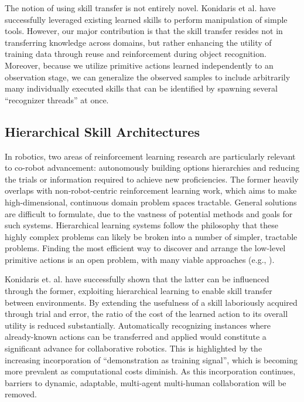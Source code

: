 \documentclass[letterpaper]{article}
\begin{document}
  The notion of using skill transfer is not entirely novel.  Konidaris et al.  have successfully leveraged existing learned skills to perform manipulation of simple tools. However, our major contribution is that the skill transfer resides not in transferring knowledge across domains, but rather enhancing the utility of training data through reuse and reinforcement during object recognition. Moreover, because we utilize primitive actions learned independently to an observation stage, we can generalize the observed samples to include arbitrarily many individually executed skills that can be identified by spawning several ``recognizer threads'' at once.


\subsection{Hierarchical Skill Architectures}
  In robotics, two areas of reinforcement learning research are particularly relevant to co-robot advancement: autonomously building options hierarchies and reducing the trials or information required to achieve new proficiencies. The former heavily overlaps with non-robot-centric reinforcement learning work, which aims to make high-dimensional, continuous domain problem spaces tractable. General solutions are difficult to formulate, due to the vastness of potential methods and goals for such systems. Hierarchical learning systems follow the philosophy that these highly complex problems can likely be broken into a number of simpler, tractable problems. Finding the most efficient way to discover and arrange the low-level primitive actions is an open problem, with many viable approaches (e.g., \citeauthor{LearningHierarchicalControl,EfficientSkillLearning,AutoHierarchyLearning}).

  Konidaris et. al.  have successfully shown that the latter can be influenced through the former, exploiting hierarchical learning to enable skill transfer between environments. By extending the usefulness of a skill laboriously acquired through trial and error, the ratio of the cost of the learned action to its overall utility is reduced substantially. Automatically recognizing instances where already-known actions can be transferred and applied would constitute a significant advance for collaborative robotics. This is highlighted by the increasing incorporation of ``demonstration as training signal'', which is becoming more prevalent as computational costs diminish. As this incorporation continues, barriers to dynamic, adaptable, multi-agent multi-human collaboration will be removed. 
	
\end{document}
